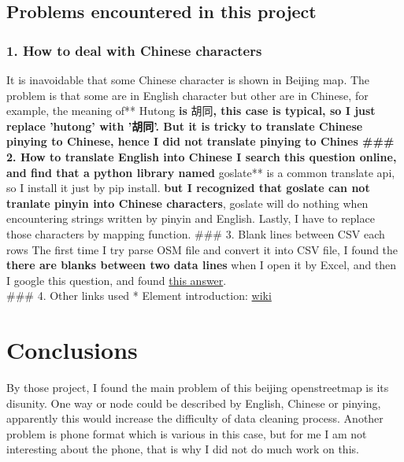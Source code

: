 \documentclass[11pt]{article}
\begin{document}
    \subsection{Problems encountered in this
project}\label{problems-encountered-in-this-project}

\subsubsection{1. How to deal with Chinese
characters}\label{how-to-deal-with-chinese-characters}

It is inavoidable that some Chinese character is shown in Beijing map.
The problem is that some are in English character but other are in
Chinese, for example, the meaning of** Hutong\textbf{ is }胡同\textbf{,
this case is typical, so I just replace 'hutong' with '胡同'. But it is
tricky to translate Chinese pinying to Chinese, hence I did not
translate pinying to Chines \#\#\# 2. How to translate English into
Chinese I search this question online, and find that a python library
named }goslate** is a common translate api, so I install it just by pip
install. \textbf{but I recognized that goslate can not tranlate pinyin
into Chinese characters}, goslate will do nothing when encountering
strings written by pinyin and English. Lastly, I have to replace those
characters by mapping function. \#\#\# 3. Blank lines between CSV each
rows The first time I try parse OSM file and convert it into CSV file, I
found the \textbf{there are blanks between two data lines} when I open
it by Excel, and then I google this question, and found
\href{https://stackoverflow.com/questions/3348460/csv-file-written-with-python-has-blank-lines-between-each-row/3348664}{this
answer}.\\
\#\#\# 4. Other links used * Element introduction:
\href{https://wiki.openstreetmap.org/wiki/Elements}{wiki}

    \section{Conclusions}\label{conclusions}

    By those project, I found the main problem of this beijing openstreetmap
is its disunity. One way or node could be described by English, Chinese
or pinying, apparently this would increase the difficulty of data
cleaning process. Another problem is phone format which is various in
this case, but for me I am not interesting about the phone, that is why
I did not do much work on this.
\end{document}
